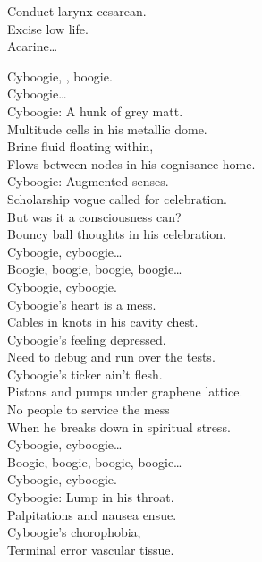 Conduct larynx cesarean. \\
Excise low life. \\
Acarine… \\





Cyboogie, , boogie. \\
Cyboogie… \\

Cyboogie: A hunk of grey matt. \\
Multitude cells in his metallic dome. \\
Brine fluid floating within, \\
Flows between nodes in his cognisance home. \\

Cyboogie: Augmented senses. \\
Scholarship vogue called for celebration. \\
But was it a consciousness can? \\
Bouncy ball thoughts in his celebration. \\

Cyboogie, cyboogie… \\
Boogie, boogie, boogie, boogie… \\
Cyboogie, cyboogie. \\

Cyboogie's heart is a mess. \\
Cables in knots in his cavity chest. \\
Cyboogie's feeling depressed. \\
Need to debug and run over the tests. \\

Cyboogie's ticker ain't flesh. \\
Pistons and pumps under graphene lattice. \\
No people to service the mess \\
When he breaks down in spiritual stress. \\

Cyboogie, cyboogie… \\
Boogie, boogie, boogie, boogie… \\
Cyboogie, cyboogie. \\

Cyboogie: Lump in his throat. \\
Palpitations and nausea ensue. \\
Cyboogie's chorophobia, \\
Terminal error vascular tissue. \\

